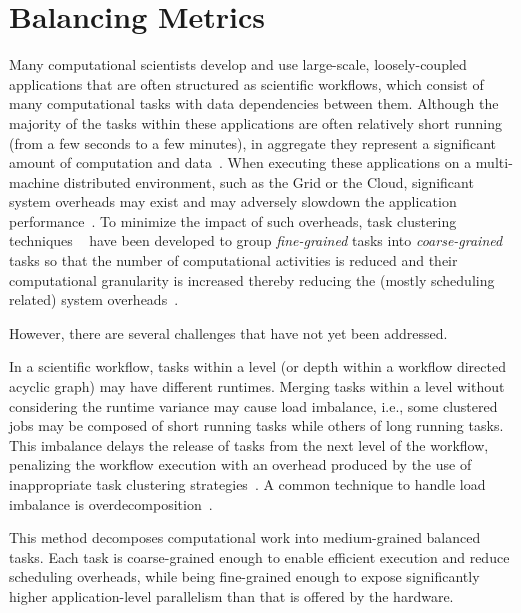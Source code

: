 \documentclass[final,5p,times,twocolumn]{elsarticle}
\begin{document}
\section{Balancing Metrics}



Many computational scientists develop and use large-scale, loosely-coupled applications that are often structured as scientific workflows, which consist of many computational tasks with data dependencies between them. Although the majority of the tasks within these applications are often relatively short running (from a few seconds to a few minutes), in aggregate they represent a significant amount of computation and data~\cite{LIGO}. When executing these applications on a multi-machine distributed environment, such as the Grid or the Cloud, significant system overheads may exist and may adversely slowdown the application performance~\cite{Chen}. To minimize the impact of such overheads, task clustering techniques
~\cite{Muthuvelu:2005:DJG:1082290.1082297, 4493929, Muthuvelu2010, Muthuvelu2013170, keat-2006, ang-2009, 4958835, Silva2013}%
have been developed to group \emph{fine-grained} tasks into \emph{coarse-grained} tasks so that the number of computational activities is reduced and their computational granularity is increased thereby reducing the (mostly scheduling related) system overheads~\cite{Chen}.

However, there are several challenges that have not yet been addressed.

In a scientific workflow, tasks within a level (or depth within a workflow directed acyclic graph) may have different runtimes. Merging tasks within a level without considering the runtime variance may cause load imbalance, i.e., some clustered jobs may be composed of short running tasks while others of long running tasks. This imbalance delays the release of tasks from the next level of the workflow, penalizing the workflow execution with an overhead produced by the use of inappropriate task clustering strategies~\cite{Chen2013}.
A common technique to handle load imbalance is overdecomposition~\cite{Lifflander}.

This method decomposes computational work into medium-grained balanced tasks. Each task is coarse-grained enough to enable efficient execution and reduce scheduling overheads, while being fine-grained enough to expose significantly higher application-level parallelism than that is offered by the hardware. 
\end{document}

